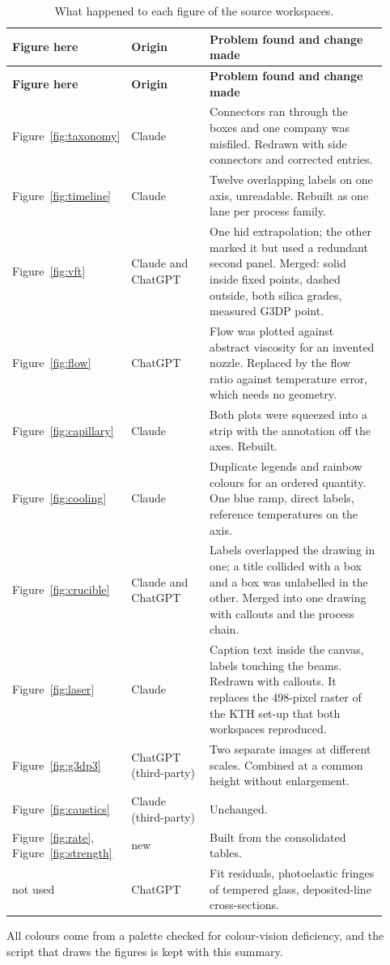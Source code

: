 \documentclass[10pt,a4paper]{article}
\begin{document}
{\footnotesize
\begin{longtable}{@{}L{0.222\linewidth}L{0.212\linewidth}L{0.482\linewidth}@{}}
  \caption{What happened to each figure of the source workspaces.}\label{tbl:figures}\\
  \toprule
  \textbf{Figure here} & \textbf{Origin} & \textbf{Problem found and change made} \\
  \midrule
  \endfirsthead
  \toprule
  \textbf{Figure here} & \textbf{Origin} & \textbf{Problem found and change made} \\
  \midrule
  \endhead
    Figure~\ref{fig:taxonomy} & Claude & Connectors ran through the boxes and one company was misfiled. Redrawn with side connectors and corrected entries. \\
    Figure~\ref{fig:timeline} & Claude & Twelve overlapping labels on one axis, unreadable. Rebuilt as one lane per process family. \\
    Figure~\ref{fig:vft} & Claude and ChatGPT & One hid extrapolation; the other marked it but used a redundant second panel. Merged: solid inside fixed points, dashed outside, both silica grades, measured G3DP point. \\
    Figure~\ref{fig:flow} & ChatGPT & Flow was plotted against abstract viscosity for an invented nozzle. Replaced by the flow ratio against temperature error, which needs no geometry. \\
    Figure~\ref{fig:capillary} & Claude & Both plots were squeezed into a strip with the annotation off the axes. Rebuilt. \\
    Figure~\ref{fig:cooling} & Claude & Duplicate legends and rainbow colours for an ordered quantity. One blue ramp, direct labels, reference temperatures on the axis. \\
    Figure~\ref{fig:crucible} & Claude and ChatGPT & Labels overlapped the drawing in one; a title collided with a box and a box was unlabelled in the other. Merged into one drawing with callouts and the process chain. \\
    Figure~\ref{fig:laser} & Claude & Caption text inside the canvas, labels touching the beams. Redrawn with callouts. It replaces the 498-pixel raster of the KTH set-up that both workspaces reproduced. \\
    Figure~\ref{fig:g3dp3} & ChatGPT (third-party) & Two separate images at different scales. Combined at a common height without enlargement. \\
    Figure~\ref{fig:caustics} & Claude (third-party) & Unchanged. \\
    Figure~\ref{fig:rate}, Figure~\ref{fig:strength} & new & Built from the consolidated tables. \\
    not used & ChatGPT & Fit residuals, photoelastic fringes of tempered glass, deposited-line cross-sections. \\
  \bottomrule
\end{longtable}
}

All colours come from a palette checked for colour-vision deficiency, and the script that draws the figures is kept with this summary.



\end{document}
